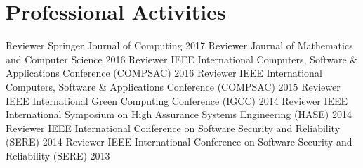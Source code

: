 \section{Professional Activities}
\begin{cvhonors}
  \cvhonor
    {Reviewer}
    {Springer Journal of Computing}
    {}
    {2017}
  \cvhonor
    {Reviewer}
    {Journal of Mathematics and Computer Science}
    {}
    {2016}
  \cvhonor
    {Reviewer}
    {IEEE International Computers, Software \& Applications Conference (COMPSAC)}
    {}
    {2016}
  \cvhonor
    {Reviewer}
    {IEEE International Computers, Software \& Applications Conference (COMPSAC)}
    {}
    {2015}
  \cvhonor
    {Reviewer}
    {IEEE International Green Computing Conference (IGCC)}
    {}
    {2014}
  \cvhonor
    {Reviewer}
    {IEEE International Symposium on High Assurance Systems Engineering (HASE)}
    {}
    {2014}
  \cvhonor
    {Reviewer}
    {IEEE International Conference on Software Security and Reliability (SERE)}
    {}
    {2014}
  \cvhonor
    {Reviewer}
    {IEEE International Conference on Software Security and Reliability (SERE)}
    {}
    {2013}
\end{cvhonors} 